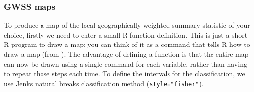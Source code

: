 \documentclass[
]{article}
\begin{document}
\subsubsection{GWSS maps}\label{gwss-maps}

To produce a map of the local geographically weighted summary statistic of your choice, firstly we need to enter a small R function definition. This is just a short R program to draw a map: you can think of it as a command that tells R how to draw a map (from \citep{chris_brunsdon_geographically_2015} ). The advantage of defining a function is that the entire map can now be drawn using a single command for each variable, rather than having to repeat those steps each time. To define the intervals for the classification, we use Jenks natural breaks classification method (\texttt{style="fisher"}).
\end{document}
